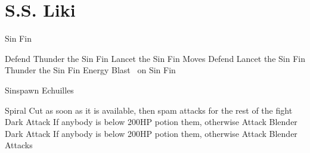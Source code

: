 \chapter{S.S. Liki}
\begin{battle}[2000]{Sin Fin}
	\begin{itemize}
		\tidusf Defend
		\switch{\yuna}{\lulu}
		\luluf Thunder the Sin Fin
		\kimahrif Lancet the Sin Fin
		\enemyf Moves
		\tidusf Defend
		\kimahrif Lancet the Sin Fin
		\luluf Thunder the Sin Fin
		\switch{\tidus}{\yuna}
		\summon{\valefor}
		\valeforf Energy Blast \od\ on Sin Fin
	\end{itemize}
\end{battle}
\begin{battle}[2000]{Sinspawn Echuilles}
	\begin{itemize}
		\tidusf Spiral Cut as soon as it is available, then spam attacks for the rest of the fight
		\wakkaf Dark Attack
		\wakkaf If anybody is below 200HP potion them, otherwise Attack
		\enemyf Blender
		\wakkaf Dark Attack
		\wakkaf If anybody is below 200HP potion them, otherwise Attack
		\enemyf Blender
		\wakkaf Attacks
	\end{itemize}
\end{battle}
